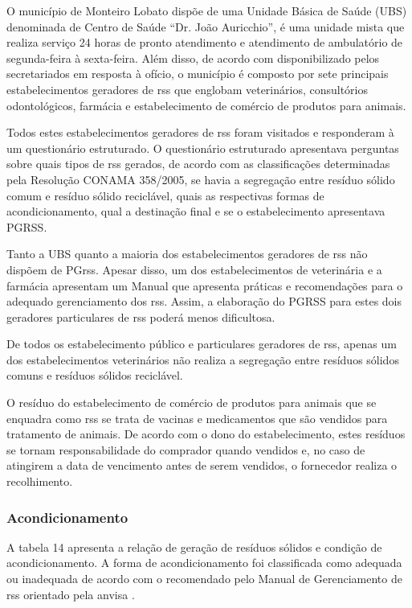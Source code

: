 	O município de Monteiro Lobato dispõe de uma Unidade Básica de Saúde (UBS) denominada de Centro de Saúde “Dr. João Auricchio”, é uma unidade mista que realiza serviço 24 horas de pronto atendimento e atendimento de ambulatório de segunda-feira à sexta-feira. Além disso, de acordo com disponibilizado pelos secretariados em resposta à ofício, o município é composto por sete principais estabelecimentos geradores de \gls{rss} que englobam veterinários, consultórios odontológicos, farmácia e estabelecimento de comércio de produtos para animais. 
	
	Todos estes estabelecimentos geradores de \gls{rss} foram visitados e responderam à um questionário estruturado. O questionário estruturado apresentava perguntas sobre quais tipos de \gls{rss} gerados, de acordo com as classificações determinadas pela Resolução CONAMA 358/2005, se havia a segregação entre resíduo sólido comum e resíduo sólido reciclável, quais as respectivas formas de acondicionamento, qual a destinação final e se o estabelecimento apresentava PGRSS.
	
	Tanto a UBS quanto a maioria dos estabelecimentos geradores de 
    \gls{rss} não dispõem de PG\gls{rss}. Apesar disso, um dos estabelecimentos de veterinária e a farmácia apresentam um Manual que apresenta práticas e recomendações para o adequado gerenciamento dos \gls{rss}. Assim, a elaboração do PGRSS para estes dois geradores particulares de \gls{rss} poderá menos dificultosa.
	
	De todos os estabelecimento público e particulares geradores de \gls{rss}, apenas um dos estabelecimentos veterinários não realiza a segregação entre resíduos sólidos comuns e resíduos sólidos reciclável.
	
	O resíduo do estabelecimento de comércio de produtos para animais que se enquadra como \gls{rss} se trata de vacinas e medicamentos que são vendidos para tratamento de animais. De acordo com o dono do estabelecimento, estes resíduos se tornam responsabilidade do comprador quando vendidos e, no caso de atingirem a data de vencimento antes de serem vendidos, o fornecedor realiza o recolhimento.
	
	\subsubsection{Acondicionamento}
	A tabela 14 apresenta a relação de geração de resíduos sólidos e condição de acondicionamento. A forma de acondicionamento foi classificada como adequada ou inadequada de acordo com o recomendado pelo Manual de Gerenciamento de \gls{rss} orientado pela \gls{anvisa} \cite{anvisa:2006}. 
	
